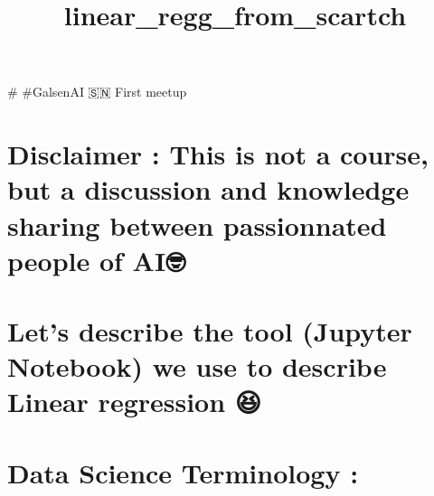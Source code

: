 \documentclass[11pt]{article}
\title{linear\_regg\_from\_scartch}
\begin{document}
    
    
    \maketitle
    
    

    
     \# \#GalsenAI 🇸🇳 First meetup

    \section{Disclaimer : This is not a course, but a discussion and
knowledge sharing between passionnated people of
AI🤓}\label{disclaimer-this-is-not-a-course-but-a-discussion-and-knowledge-sharing-between-passionnated-people-of-ai}

    \section{Let's describe the tool (Jupyter Notebook) we use to describe
Linear regression
😆}\label{lets-describe-the-tool-jupyter-notebook-we-use-to-describe-linear-regression}

    \section{Data Science Terminology :}\label{data-science-terminology}
\end{document}
